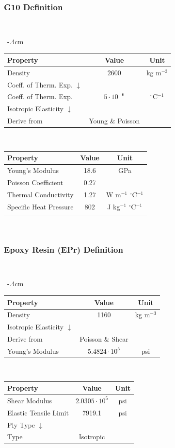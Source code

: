 \documentclass{amsdtx}
\begin{document}
\subsubsection{G10 Definition}
~\\[-3em]
\begin{table}[H]
\centering
\renewcommand{\arraystretch}{1.4}
~\kern-.4cm\begin{tabular}{l|c|c}
\bf Property & \bf Value & \bf Unit \\\hline\hline
Density & 2600 & kg m$^{-3}$ \\\hline
Coeff. of Therm. Exp. $\downarrow$ & & \\\hline
\quad Coeff. of Therm. Exp. & $5\cdot 10^{-6}$ & $^\circ$C$^{-1}$ \\\hline
Isotropic Elasticity $\downarrow$ & & \\\hline
\quad Derive from & Young \& Poisson & \\\hline
\end{tabular}~~~~~~
\begin{tabular}{l|c|c}
\bf Property & \bf Value & \bf Unit \\\hline\hline
\quad Young's Modulus & 18.6 & GPa \\\hline
\quad Poisson Coefficient & 0.27 & \\\hline
Thermal Conductivity & 1.27 & W m$^{-1}$ $^\circ$C$^{-1}$ \\\hline
Specific Heat Pressure & 802 & J kg$^{-1}$ $^\circ$C$^{-1}$\\\hline&&\\\hline
\end{tabular}
\end{table}

~
\subsubsection{Epoxy Resin (EPr) Definition}
~\\[-3em]
\begin{table}[H]
\centering
\renewcommand{\arraystretch}{1.4}
~\kern-.4cm\begin{tabular}{l|c|c}
\bf Property & \bf Value & \bf Unit \\\hline\hline
Density & 1160 & kg m$^{-3}$ \\\hline
Isotropic Elasticity $\downarrow$ & & \\\hline
\quad Derive from & Poisson \& Shear & \\\hline
\quad Young's Modulus & $5.4824\cdot 10^5$ & psi \\\hline
\end{tabular}~~~~~~
\begin{tabular}{l|c|c}
\bf Property & \bf Value & \bf Unit \\\hline\hline
\quad Shear Modulus & $2.0305\cdot 10^5$ & psi\\\hline
Elastic Tensile Limit & 7919.1 & psi \\\hline
Ply Type $\downarrow$ &  &\\\hline
\quad Type & Isotropic & \\\hline
\end{tabular}
\end{table}\newpage
\end{document}
